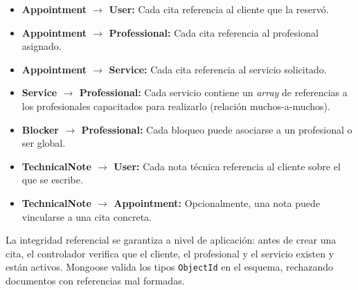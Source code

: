 \begin{itemize}
    \item \textbf{Appointment $\rightarrow$ User:} Cada cita referencia al cliente que la reserv\'o.
    \item \textbf{Appointment $\rightarrow$ Professional:} Cada cita referencia al profesional asignado.
    \item \textbf{Appointment $\rightarrow$ Service:} Cada cita referencia al servicio solicitado.
    \item \textbf{Service $\rightarrow$ Professional:} Cada servicio contiene un \textit{array} de referencias a los profesionales capacitados para realizarlo (relaci\'on muchos-a-muchos).
    \item \textbf{Blocker $\rightarrow$ Professional:} Cada bloqueo puede asociarse a un profesional o ser global.
    \item \textbf{TechnicalNote $\rightarrow$ User:} Cada nota t\'ecnica referencia al cliente sobre el que se escribe.
    \item \textbf{TechnicalNote $\rightarrow$ Appointment:} Opcionalmente, una nota puede vincularse a una cita concreta.
\end{itemize}

La integridad referencial se garantiza a nivel de aplicaci\'on: antes de crear una cita, el controlador verifica que el cliente, el profesional y el servicio existen y est\'an activos. Mongoose valida los tipos \texttt{ObjectId} en el esquema, rechazando documentos con referencias mal formadas.

